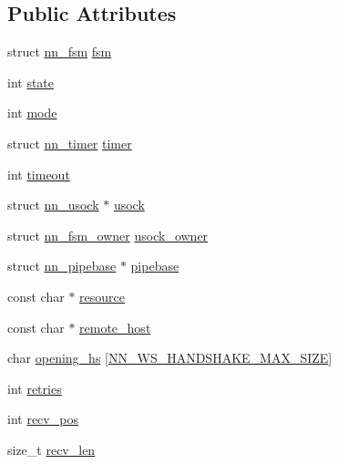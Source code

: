 \subsection*{Public Attributes}
\begin{DoxyCompactItemize}
\item 
struct \hyperlink{structnn__fsm}{nn\+\_\+fsm} \hyperlink{structnn__ws__handshake_aa80c61adc0dc7a0231487fb769050e65}{fsm}
\item 
int \hyperlink{structnn__ws__handshake_ab97b3c075f8b24eed4e04b491ad7cf06}{state}
\item 
int \hyperlink{structnn__ws__handshake_a15288545ca40c9759a9f75bff1c53709}{mode}
\item 
struct \hyperlink{structnn__timer}{nn\+\_\+timer} \hyperlink{structnn__ws__handshake_ae3a442388d2724d46575eb9de36224fa}{timer}
\item 
int \hyperlink{structnn__ws__handshake_a7f914e8dc5832e38d64f383af5e37942}{timeout}
\item 
struct \hyperlink{structnn__usock}{nn\+\_\+usock} $\ast$ \hyperlink{structnn__ws__handshake_aafe5096050974f37b482331217a97d02}{usock}
\item 
struct \hyperlink{structnn__fsm__owner}{nn\+\_\+fsm\+\_\+owner} \hyperlink{structnn__ws__handshake_a464dff1c646c33536bb1b38e66632866}{usock\+\_\+owner}
\item 
struct \hyperlink{structnn__pipebase}{nn\+\_\+pipebase} $\ast$ \hyperlink{structnn__ws__handshake_a8cf713ab9292e7a6019d192004ef7c38}{pipebase}
\item 
const char $\ast$ \hyperlink{structnn__ws__handshake_aa3fee6149a01e22d561b247ca393e933}{resource}
\item 
const char $\ast$ \hyperlink{structnn__ws__handshake_a67458638c68ae77cdb160d37ebbf6070}{remote\+\_\+host}
\item 
char \hyperlink{structnn__ws__handshake_a517c18c19321c84f50b5db3bc54df51e}{opening\+\_\+hs} \mbox{[}\hyperlink{ws__handshake_8h_a69ce694d268a249264eced5ef505d018}{N\+N\+\_\+\+W\+S\+\_\+\+H\+A\+N\+D\+S\+H\+A\+K\+E\+\_\+\+M\+A\+X\+\_\+\+S\+I\+ZE}\mbox{]}
\item 
int \hyperlink{structnn__ws__handshake_a0e398b73cc863d25a21c8e83024adf9a}{retries}
\item 
int \hyperlink{structnn__ws__handshake_ae6cf4d8f60004838480ef0f76e263906}{recv\+\_\+pos}
\item 
size\+\_\+t \hyperlink{structnn__ws__handshake_af82168d1f0322e6f902b99f9632b7871}{recv\+\_\+len}
\item 

\end{DoxyCompactItemize}
